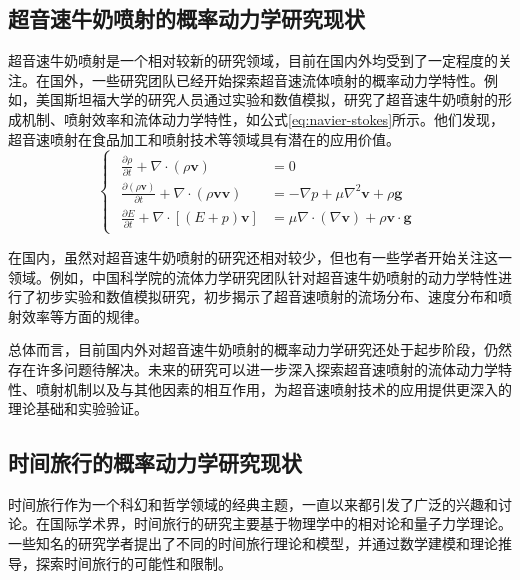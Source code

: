 \subsection{超音速牛奶喷射的概率动力学研究现状}
超音速牛奶喷射是一个相对较新的研究领域，目前在国内外均受到了一定程度的关注。在国外，一些研究团队已经开始探索超音速流体喷射的概率动力学特性。例如，美国斯坦福大学的研究人员通过实验和数值模拟，研究了超音速牛奶喷射的形成机制、喷射效率和流体动力学特性，如公式\ref{eq:navier-stokes}所示。他们发现，超音速喷射在食品加工和喷射技术等领域具有潜在的应用价值。
\begin{equation}
  \begin{cases}
    \begin{aligned}
      \frac{\partial \rho}{\partial t} + \nabla \cdot (\rho \mathbf{v})                         & = 0                                                                                  \\
      \frac{\partial (\rho \mathbf{v})}{\partial t} + \nabla \cdot (\rho \mathbf{v} \mathbf{v}) & = -\nabla p + \mu \nabla^2 \mathbf{v} + \rho \mathbf{g}                              \\
      \frac{\partial E}{\partial t} + \nabla \cdot \left[(E + p) \mathbf{v}\right]              & = \mu \nabla \cdot \left(\nabla \mathbf{v}\right) + \rho \mathbf{v} \cdot \mathbf{g}
    \end{aligned}
  \end{cases}
  \label{eq:navier-stokes}
\end{equation}

在国内，虽然对超音速牛奶喷射的研究还相对较少，但也有一些学者开始关注这一领域。例如，中国科学院的流体力学研究团队针对超音速牛奶喷射的动力学特性进行了初步实验和数值模拟研究，初步揭示了超音速喷射的流场分布、速度分布和喷射效率等方面的规律。

总体而言，目前国内外对超音速牛奶喷射的概率动力学研究还处于起步阶段，仍然存在许多问题待解决。未来的研究可以进一步深入探索超音速喷射的流体动力学特性、喷射机制以及与其他因素的相互作用，为超音速喷射技术的应用提供更深入的理论基础和实验验证。

\subsection{时间旅行的概率动力学研究现状}
时间旅行作为一个科幻和哲学领域的经典主题，一直以来都引发了广泛的兴趣和讨论。在国际学术界，时间旅行的研究主要基于物理学中的相对论和量子力学理论。一些知名的研究学者提出了不同的时间旅行理论和模型，并通过数学建模和理论推导，探索时间旅行的可能性和限制。

